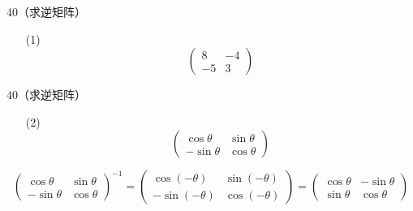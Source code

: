 \begin{frame}
  \begin{footnotesize}
    \begin{exampleblock}{40（求逆矩阵）}
      \begin{itemize}
      \item[(1)]
        $$
        \left(
        \begin{array}{rr}
          8&-4\\
          -5&3
        \end{array}
        \right)
        $$
      \end{itemize}
    \end{exampleblock}
  \end{footnotesize}
\end{frame}

\begin{frame}
  \begin{footnotesize}
    \begin{exampleblock}{40（求逆矩阵）}
      \begin{itemize}
      \item[(2)]
        $$
        \left(
        \begin{array}{rr}
          \cos\theta&\sin\theta\\
          -\sin\theta&\cos\theta
        \end{array}
        \right)
        $$
      \end{itemize}
    \end{exampleblock}

    $$
    \left(
    \begin{array}{rr}
      \cos\theta&\sin\theta\\
      -\sin\theta&\cos\theta
    \end{array}
    \right)^{-1}=
    \left(
    \begin{array}{rr}
      \cos(-\theta)&\sin(-\theta)\\
      -\sin(-\theta)&\cos(-\theta)
    \end{array}
    \right)=     \left(
    \begin{array}{rr}
      \cos\theta&-\sin\theta\\
      \sin\theta&\cos\theta
    \end{array}
    \right)
    $$
  \end{footnotesize}
\end{frame}


